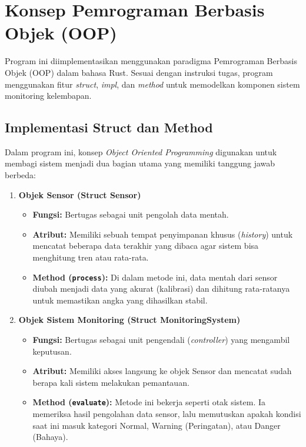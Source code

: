 \documentclass[12pt,a4paper]{article}
\begin{document}
\section{Konsep Pemrograman Berbasis Objek (OOP)}
Program ini diimplementasikan menggunakan paradigma Pemrograman Berbasis Objek (OOP) dalam bahasa Rust. Sesuai dengan instruksi tugas, program menggunakan fitur \textit{struct}, \textit{impl}, dan \textit{method} untuk memodelkan komponen sistem monitoring kelembapan.

\subsection{Implementasi Struct dan Method}

Dalam program ini, konsep \textit{Object Oriented Programming} digunakan untuk membagi sistem menjadi dua bagian utama yang memiliki tanggung jawab berbeda:

\begin{enumerate}
    \item \textbf{Objek Sensor (Struct Sensor)}
    \begin{itemize}
        \item \textbf{Fungsi:} Bertugas sebagai unit pengolah data mentah.
        \item \textbf{Atribut:} Memiliki sebuah tempat penyimpanan khusus (\textit{history}) untuk mencatat beberapa data terakhir yang dibaca agar sistem bisa menghitung tren atau rata-rata.
        \item \textbf{Method (\texttt{process}):} Di dalam metode ini, data mentah dari sensor diubah menjadi data yang akurat (kalibrasi) dan dihitung rata-ratanya untuk memastikan angka yang dihasilkan stabil.
    \end{itemize}
    
    \item \textbf{Objek Sistem Monitoring (Struct MonitoringSystem)}
    \begin{itemize}
        \item \textbf{Fungsi:} Bertugas sebagai unit pengendali (\textit{controller}) yang mengambil keputusan.
        \item \textbf{Atribut:} Memiliki akses langsung ke objek Sensor dan mencatat sudah berapa kali sistem melakukan pemantauan.
        \item \textbf{Method (\texttt{evaluate}):} Metode ini bekerja seperti otak sistem. Ia memeriksa hasil pengolahan data sensor, lalu memutuskan apakah kondisi saat ini masuk kategori Normal, Warning (Peringatan), atau Danger (Bahaya).
    \end{itemize}
\end{enumerate}
\end{document}

